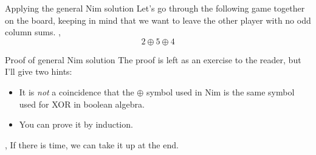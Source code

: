	\begin{namedframe}{Applying the general Nim solution}
		Let's go through the following game together on the board, keeping in mind that we want to leave the other player with no odd column sums.
		\sep
		\[2 \oplus 5 \oplus 4\]
	\end{namedframe}
	\begin{namedframe}{Proof of general Nim solution}
		The proof is left as an exercise to the reader, but I'll give two hints:
		\begin{itemize}
			\item It is \emph{not} a coincidence that the $\oplus$ symbol used in Nim is the same symbol used for XOR in boolean algebra.
			\item You can prove it by induction.
		\end{itemize}
		\sep
		If there is time, we can take it up at the end.
	\end{namedframe}

